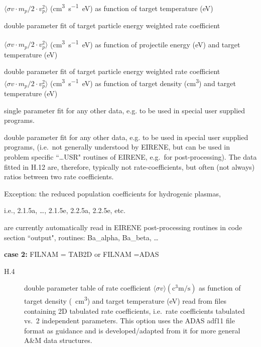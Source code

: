 \begin{description}
\begin{description}
                $\langle \sigma v \cdot m_p / 2 \cdot v_p^2 \rangle$
                (\si{\cubic\centi\metre\per\second\electronvolt}) as function of target
                temperature (\si{\electronvolt})
          \item[H.9] double parameter fit of target
                particle energy weighted rate coefficient 

                $\langle \sigma v \cdot m_p / 2 \cdot v_p^2 \rangle$
                (\si{\cubic\centi\metre\per\second\electronvolt}) as function of projectile
                energy (\si{\electronvolt}) and target temperature (\si{\electronvolt})
          \item[H.10] double parameter fit of target particle energy weighted rate
                coefficient $\langle \sigma v \cdot m_p / 2 \cdot v_p^2 \rangle$
                (\si{\cubic\centi\metre\per\second\electronvolt}) as function of target density
                (\si{\cubic\centi\metre}) and target temperature (\si{\electronvolt})
          \item[H.11] single parameter fit for any other data, e.g. to be used in special
                user supplied programs.
          \item[H.12] double parameter fit for any other data, e.g. to be used in special
                user supplied programs, (i.e.\ not generally understood by EIRENE, but can be
                used in problem specific ``\dots USR" routines of EIRENE, e.g.\ for
                post-processing).
                The data fitted in H.12 are, therefore, typically not rate-coefficients, but
                often (not always) ratios between two rate coefficients.

                Exception: the reduced population coefficients for hydrogenic plasmas,

                i.e., 2.1.5a, \dots, 2.1.5e, 2.2.5a, 2.2.5e, etc.\ 

                are currently automatically read in EIRENE post-processing routines in code
                section ``output", routines: Ba\_alpha, Ba\_beta, \dots
        \end{description}

        \textbf{case 2:} FILNAM = TAB2D  or FILNAM =ADAS
        \begin{description}
          \item[H.4]
                double parameter table of rate coefficient $\langle \sigma v \rangle
                  (\si{\cubic\centi\metre\per\second})$ as function of target density
                (\si{\per\cubic\centi\metre}) and target temperature (\si{\electronvolt}) read
                from files containing 2D tabulated rate coefficients, i.e.\ rate coefficients
                tabulated vs.\ 2 independent parameters.
                This option uses the \ac{ADAS} adf11 file format as guidance and is
                developed\slash adapted from it for more general A\&M data structures.


\end{description}
\end{description}
